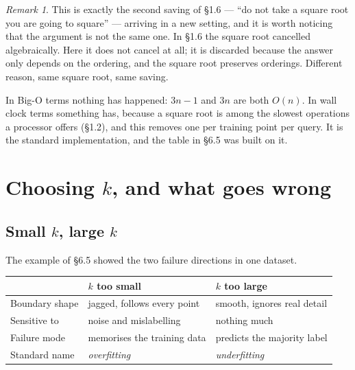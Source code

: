 \documentclass[11pt]{article}
\theoremstyle{plain}
\theoremstyle{definition}
\theoremstyle{remark}
\newtheorem*{rmk}{Remark}
\begin{document}
\begin{rmk}
This is exactly the second saving of \S1.6 --- ``do not take a square root you
are going to square'' --- arriving in a new setting, and it is worth noticing
that the argument is not the same one. In \S1.6 the square root cancelled
algebraically. Here it does not cancel at all; it is discarded because the
answer only depends on the ordering, and the square root preserves orderings.
Different reason, same square root, same saving.

In Big-O terms nothing has happened: $3n-1$ and $3n$ are both $O(n)$. In wall
clock terms something has, because a square root is among the slowest operations
a processor offers (\S1.2), and this removes one per training point per query.
It is the standard implementation, and the table in \S6.5 was built on it.
\end{rmk}

\section{Choosing \texorpdfstring{$k$}{k}, and what goes wrong}
\subsection{Small $k$, large $k$}
The example of \S6.5 showed the two failure directions in one dataset.

\begin{center}
\renewcommand{\arraystretch}{1.35}
\begin{tabular}{@{}l l l@{}}
\toprule
& \textbf{$k$ too small} & \textbf{$k$ too large} \\
\midrule
Boundary shape   & jagged, follows every point & smooth, ignores real detail \\
Sensitive to     & noise and mislabelling      & nothing much \\
Failure mode     & memorises the training data & predicts the majority label \\
Standard name    & \emph{overfitting}          & \emph{underfitting} \\
\bottomrule
\end{tabular}
\end{center}
\end{document}
